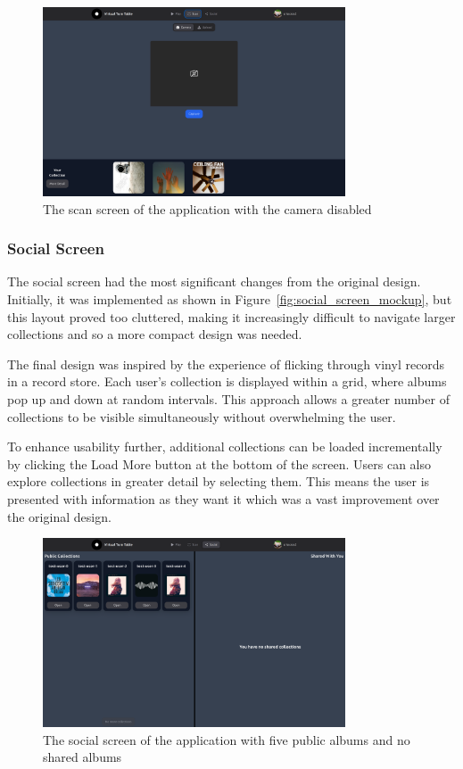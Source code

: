 \begin{figure} [H]
    \centering
    \includegraphics[width=0.8\textwidth]{figures/scan_screen.png}
    \caption{The scan screen of the application with the camera disabled}
    \label{fig:scan_screen}
\end{figure}

\subsubsection{Social Screen}
The social screen had the most significant changes from the original design. Initially, it was implemented as shown in Figure~\ref{fig:social_screen_mockup}, but this layout proved too cluttered, making it increasingly difficult to navigate larger collections and so a more compact design was needed.

The final design was inspired by the experience of flicking through vinyl records in a record store. Each user's collection is displayed within a grid, where albums pop up and down at random intervals. This approach allows a greater number of collections to be visible simultaneously without overwhelming the user.

To enhance usability further, additional collections can be loaded incrementally by clicking the Load More button at the bottom of the screen. Users can also explore collections in greater detail by selecting them. This means the user is presented with information as they want it which was a vast improvement over the original design.

\begin{figure} [H]
    \centering
    \includegraphics[width=0.8\textwidth]{figures/social_screen.png}
    \caption{The social screen of the application with five public albums and no shared albums}
    \label{fig:social screen}
\end{figure}

